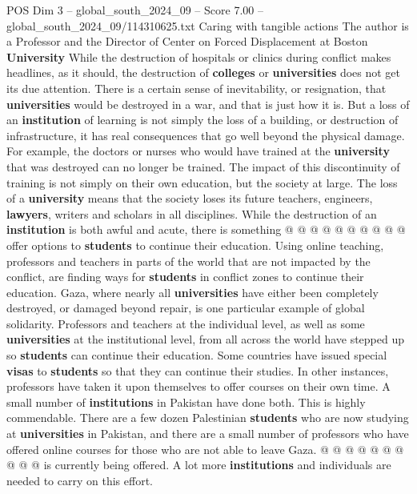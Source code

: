 \begin{textsample}{POS Dim 3 – global\_south\_2024\_09 – Score 7.00 – global\_south\_2024\_09/114310625.txt}  \label{ex:f3_pos_337}
Caring with tangible actions The author is a Professor and the Director of Center on Forced Displacement at Boston \textbf{University} While the destruction of hospitals or clinics during conflict makes headlines, as it should, the destruction of \textbf{colleges} or \textbf{universities} does not get its due attention.
There is a certain sense of inevitability, or resignation, that \textbf{universities} would be destroyed in a war, and that is just how it is.
But a loss of an \textbf{institution} of learning is not simply the loss of a building, or destruction of infrastructure, it has real consequences that go well beyond the physical damage.
For example, the doctors or nurses who would have trained at the \textbf{university} that was destroyed can no longer be trained.
The impact of this discontinuity of training is not simply on their own education, but the society at large.
The loss of a \textbf{university} means that the society loses its future teachers, engineers, \textbf{lawyers}, writers and scholars in all disciplines.
While the destruction of an \textbf{institution} is both awful and acute, there is something @ @ @ @ @ @ @ @ @ @ offer options to \textbf{students} to continue their education.
Using online teaching, professors and teachers in parts of the world that are not impacted by the conflict, are finding ways for \textbf{students} in conflict zones to continue their education.
Gaza, where nearly all \textbf{universities} have either been completely destroyed, or damaged beyond repair, is one particular example of global solidarity.
Professors and teachers at the individual level, as well as some \textbf{universities} at the institutional level, from all across the world have stepped up so \textbf{students} can continue their education.
Some countries have issued special \textbf{visas} to \textbf{students} so that they can continue their studies.
In other instances, professors have taken it upon themselves to offer courses on their own time.
A small number of \textbf{institutions} in Pakistan have done both.
This is highly commendable.
There are a few dozen Palestinian \textbf{students} who are now studying at \textbf{universities} in Pakistan, and there are a small number of professors who have offered online courses for those who are not able to leave Gaza. @ @ @ @ @ @ @ @ @ @ is currently being offered.
A lot more \textbf{institutions} and individuals are needed to carry on this effort.

\end{textsample}
